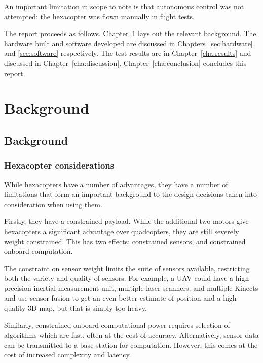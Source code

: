 \documentclass[12pt,oneside,a4paper]{book}
\begin{document}
An important limitation in scope to note is that autonomous control
was not attempted: the hexacopter was flown manually in flight tests.

The report proceeds as follows. 
Chapter~\ref{cha:background} lays out the relevant background. The
hardware built and software developed are discussed in
Chapters~\ref{sec:hardware} and \ref{sec:software} respectively. The
test results are in Chapter~\ref{cha:results} and discussed in
Chapter~\ref{cha:discussion}. Chapter~\ref{cha:conclusion} concludes
this report.

\part{Background}
\chapter{Background}
\label{cha:background}

\section{Hexacopter considerations}
\label{sec:hexac-cons}

While hexacopters have a number of advantages, they have a number of
limitations that form an important background to the design decisions
taken into consideration when using them.

Firstly, they have a constrained payload. While the additional two
motors give hexacopters a significant advantage over quadcopters, they
are still severely weight constrained. This has two effects:
constrained sensors, and constrained onboard computation.

The constraint on sensor weight limits the suite of sensors available,
restricting both the variety and quality of sensors. For example, a
UAV could have a high precision inertial measurement unit, multiple
laser scanners, and multiple Kinects and use sensor fusion to get an
even better estimate of position and a high quality 3D map, but that is
simply too heavy.

Similarly, constrained onboard computational power requires selection
of algorithms which are fast, often at the cost of accuracy.
Alternatively, sensor data can be transmitted to a base station for
computation. However, this comes at the cost of increased complexity
and latency.
\end{document}
